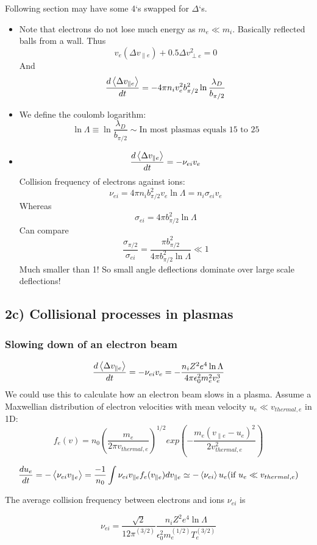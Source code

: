 Following section may have some 4`s swapped for $\Delta$`s. 
\begin{itemize}
\item Note that electrons do not lose much energy as $m_e \ll m_i$. Basically reflected balls from a wall. Thus
\[ v_e (\Delta v_{\parallel e}) + 0.5 \Delta v_{\perp e}^2 = 0\]
And
\[\frac{d \left< \Delta v_{\parallel e} \right>}{d t} = - 4 \pi n_i v_e^2 b_{\pi/2}^2 \ln{\frac{\lambda_D}{b_{\pi/2}}} \]
\item We define the coulomb logarithm: 
\[ \ln{\Lambda} \equiv \ln{\frac{\lambda_D}{b_{\pi/2}}} \sim \text{In most plasmas equals  15 to 25} \]
\item 
\[ \frac{d \left< \Delta v_{\parallel e}  \right>}{d t} = - \nu_{ei} v_e \]
Collision frequency of electrons against ions:
\[ \nu_{ei} = 4 \pi n_i b_{\pi/2}^2 v_e \ln{\Lambda} = n_i \sigma_{ei} v_e \]
Whereas
\[ \sigma_{ei} = 4 \pi b_{\pi/2}^2 \ln{\Lambda} \]
Can compare 
\[ \frac{\sigma_{\pi/2}}{\sigma_{ei}} = \frac{\pi b_{\pi/2}^2}{4 \pi b_{\pi/2}^2 \ln{\Lambda}} \ll 1\]
Much smaller than 1! So small angle deflections dominate over large scale deflections!
\end{itemize}

\subsection{2c) Collisional processes in plasmas}
\subsubsection{Slowing down of an electron beam}
\[ \frac{d \left< \Delta v_{\parallel e}  \right>}{d t} = - \nu_{ei} v_e = -\frac{n_i Z^2 e^4 \ln{\Lambda}}{4 \pi \epsilon_0^2 m_e^2 v_e^3} \]
We could use this to calculate how an electron beam slows in a plasma.
Assume a Maxwellian distribution of electron velocities with mean velocity $u_e\ll v_{thermal, e}$ in 1D:
\[ f_e(v) = n_0 (\frac{m_e}{2 \pi v_{thermal,e}})^{1/2} exp(-\frac{m_e (v_{\parallel e} - u_e)^2}{2 v_{thermal,e}^2}) \]

\[ \frac{d u_e}{d t} = -\left< \nu_{ei} v_{\parallel e} \right> = \frac{-1}{n_0} \int{\nu_{ei} v_{\parallel e} f_e(v_{\parallel e}) dv_{\parallel e}} \simeq -\left< \nu_{ei} \right> u_e (\text{if } u_e \ll v_{thermal, e})\]  

The average collision frequency between electrons and ions $\nu_{ei}$ is

\[ \nu_{ei} = \frac{\sqrt{2}}{12 \pi^(3/2)} \frac{n_i Z^2 e^4 \ln{\Lambda}}{\epsilon_0^2 m_e^(1/2) T_e^(3/2)} \]

